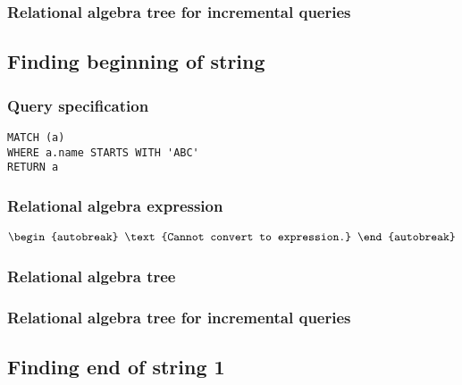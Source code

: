 
\subsubsection*{Relational algebra tree for incremental queries}


\subsection{Finding beginning of string}

\subsubsection*{Query specification}

\begin{lstlisting}
MATCH (a)
WHERE a.name STARTS WITH 'ABC'
RETURN a
\end{lstlisting}

\subsubsection*{Relational algebra expression}

\begin{align*}
\begin{autobreak}
\text{Cannot convert to expression.}
\end{autobreak}
\end{align*}

\subsubsection*{Relational algebra tree}


\subsubsection*{Relational algebra tree for incremental queries}


\subsection{Finding end of string 1}


